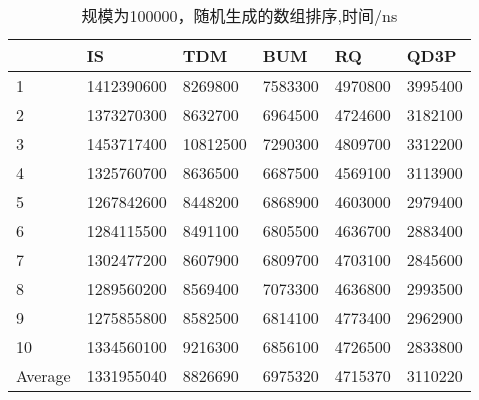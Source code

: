 \documentclass[12pt,a4paper]{ctexart}
\begin{document}
\begin{table}[H]
    \setlength{\abovecaptionskip}{0cm}
    \setlength{\belowcaptionskip}{0.5cm}
    \small
    \centering
    \caption[short]{规模为100000，随机生成的数组排序,时间/ns}
    \begin{tabular}{|l|l|l|l|l|l|}
        \hline
                & IS         & TDM      & BUM     & RQ      & QD3P    \\ \hline
        1       & 1412390600 & 8269800  & 7583300 & 4970800 & 3995400 \\ \hline
        2       & 1373270300 & 8632700  & 6964500 & 4724600 & 3182100 \\ \hline
        3       & 1453717400 & 10812500 & 7290300 & 4809700 & 3312200 \\ \hline
        4       & 1325760700 & 8636500  & 6687500 & 4569100 & 3113900 \\ \hline
        5       & 1267842600 & 8448200  & 6868900 & 4603000 & 2979400 \\ \hline
        6       & 1284115500 & 8491100  & 6805500 & 4636700 & 2883400 \\ \hline
        7       & 1302477200 & 8607900  & 6809700 & 4703100 & 2845600 \\ \hline
        8       & 1289560200 & 8569400  & 7073300 & 4636800 & 2993500 \\ \hline
        9       & 1275855800 & 8582500  & 6814100 & 4773400 & 2962900 \\ \hline
        10      & 1334560100 & 9216300  & 6856100 & 4726500 & 2833800 \\ \hline
        Average & 1331955040 & 8826690  & 6975320 & 4715370 & 3110220 \\ \hline
    \end{tabular}

\end{table}
\end{document}
